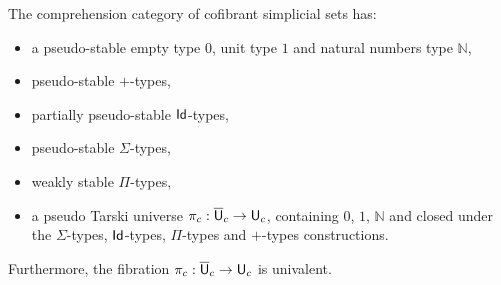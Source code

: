 \documentclass[reqno,10pt,a4paper,oneside,draft]{amsart}
\begin{document}
\begin{theorem} \label{th:main_ContextualCat} The comprehension category of cofibrant simplicial sets has:
\begin{itemize}
\item a pseudo-stable empty type $0$, unit type $1$ and natural numbers type $\mathbb{N}$,
\item pseudo-stable $+$-types,
\item partially pseudo-stable $\mathsf{Id}$-types,
\item pseudo-stable $\Sigma$-types,
\item weakly stable $\Pi$-types,
\item a pseudo Tarski universe $\pi_c: \overline{\mathsf{U}}_c \rightarrow \mathsf{U}_c$, containing $0$, $1$, $\mathbb{N}$ and closed under the $\Sigma$-types, $\mathsf{Id}$-types, $\Pi$-types and $+$-types constructions.
\end{itemize}
Furthermore, the fibration $\pi_c: \overline{\mathsf{U}}_c \rightarrow \mathsf{U}_c $ is univalent.
\end{theorem}
\end{document}
